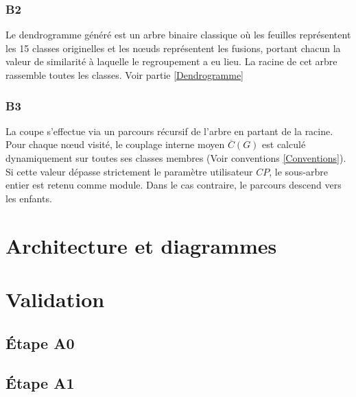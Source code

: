 \documentclass{Templates/customArticle}
\begin{document}
\subsubsection{B2}

Le dendrogramme généré est un arbre binaire classique où les feuilles représentent les 15 classes originelles et les nœuds représentent les fusions, portant chacun la valeur de similarité à laquelle le regroupement a eu lieu. La racine de cet arbre rassemble toutes les classes. Voir partie \ref{Dendrogramme}

\subsubsection{B3}

La coupe s'effectue via un parcours récursif de l'arbre en partant de la racine. Pour chaque nœud visité, le couplage interne moyen $\overline{C}(G)$ est calculé dynamiquement sur toutes ses classes membres (Voir conventions \ref{Conventions}). Si cette valeur dépasse strictement le paramètre utilisateur $CP$, le sous-arbre entier est retenu comme module. Dans le cas contraire, le parcours descend vers les enfants.

\section{Architecture et diagrammes}


\label{Dendrogramme}
\newpage
\section{Validation}

\subsection{Étape A0}



\newpage
\subsection{Étape A1}
\end{document}
